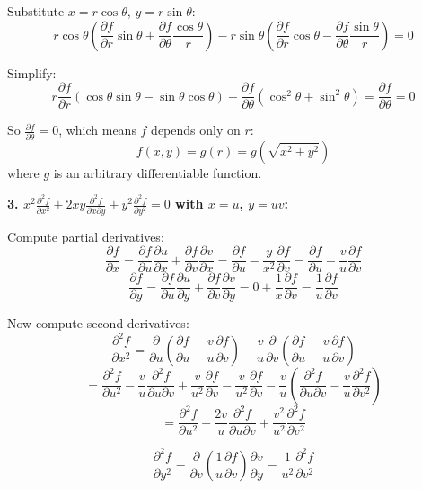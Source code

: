 \documentclass[12pt]{article}
\begin{document}
\begin{correctionbox}
Substitute $x = r\cos\theta$, $y = r\sin\theta$:
$$r\cos\theta\left(\frac{\partial f}{\partial r}\sin\theta + \frac{\partial f}{\partial \theta}\frac{\cos\theta}{r}\right) - r\sin\theta\left(\frac{\partial f}{\partial r}\cos\theta - \frac{\partial f}{\partial \theta}\frac{\sin\theta}{r}\right) = 0$$

Simplify:
$$r\frac{\partial f}{\partial r}(\cos\theta\sin\theta - \sin\theta\cos\theta) + \frac{\partial f}{\partial \theta}(\cos^2\theta + \sin^2\theta) = \frac{\partial f}{\partial \theta} = 0$$

So $\frac{\partial f}{\partial \theta} = 0$, which means $f$ depends only on $r$:
$$f(x,y) = g(r) = g(\sqrt{x^2 + y^2})$$
where $g$ is an arbitrary differentiable function.

\textbf{3. $x^2 \frac{\partial^2 f}{\partial x^2} + 2xy \frac{\partial^2 f}{\partial x \partial y} + y^2 \frac{\partial^2 f}{\partial y^2} = 0$ with $x = u$, $y = uv$:}

Compute partial derivatives:
$$\frac{\partial f}{\partial x} = \frac{\partial f}{\partial u}\frac{\partial u}{\partial x} + \frac{\partial f}{\partial v}\frac{\partial v}{\partial x} = \frac{\partial f}{\partial u} - \frac{y}{x^2}\frac{\partial f}{\partial v} = \frac{\partial f}{\partial u} - \frac{v}{u}\frac{\partial f}{\partial v}$$
$$\frac{\partial f}{\partial y} = \frac{\partial f}{\partial u}\frac{\partial u}{\partial y} + \frac{\partial f}{\partial v}\frac{\partial v}{\partial y} = 0 + \frac{1}{x}\frac{\partial f}{\partial v} = \frac{1}{u}\frac{\partial f}{\partial v}$$

Now compute second derivatives:
$$\frac{\partial^2 f}{\partial x^2} = \frac{\partial}{\partial u}\left(\frac{\partial f}{\partial u} - \frac{v}{u}\frac{\partial f}{\partial v}\right) - \frac{v}{u}\frac{\partial}{\partial v}\left(\frac{\partial f}{\partial u} - \frac{v}{u}\frac{\partial f}{\partial v}\right)$$
$$= \frac{\partial^2 f}{\partial u^2} - \frac{v}{u}\frac{\partial^2 f}{\partial u \partial v} + \frac{v}{u^2}\frac{\partial f}{\partial v} - \frac{v}{u^2}\frac{\partial f}{\partial v} - \frac{v}{u}\left(\frac{\partial^2 f}{\partial u \partial v} - \frac{v}{u}\frac{\partial^2 f}{\partial v^2}\right)$$
$$= \frac{\partial^2 f}{\partial u^2} - \frac{2v}{u}\frac{\partial^2 f}{\partial u \partial v} + \frac{v^2}{u^2}\frac{\partial^2 f}{\partial v^2}$$

$$\frac{\partial^2 f}{\partial y^2} = \frac{\partial}{\partial v}\left(\frac{1}{u}\frac{\partial f}{\partial v}\right)\frac{\partial v}{\partial y} = \frac{1}{u^2}\frac{\partial^2 f}{\partial v^2}$$


\end{correctionbox}
\end{document}
